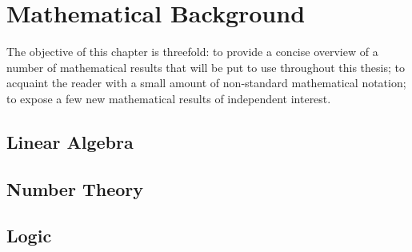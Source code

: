 \chapter{Mathematical Background}
The objective of this chapter is threefold: to provide a concise overview of a number of mathematical results that will be put to use throughout this thesis; to acquaint the reader with a small amount of non-standard mathematical notation; to expose a few new mathematical results of independent interest.
\label{ch:background}
\section{Linear Algebra}



\section{Number Theory}





\section{Logic}



